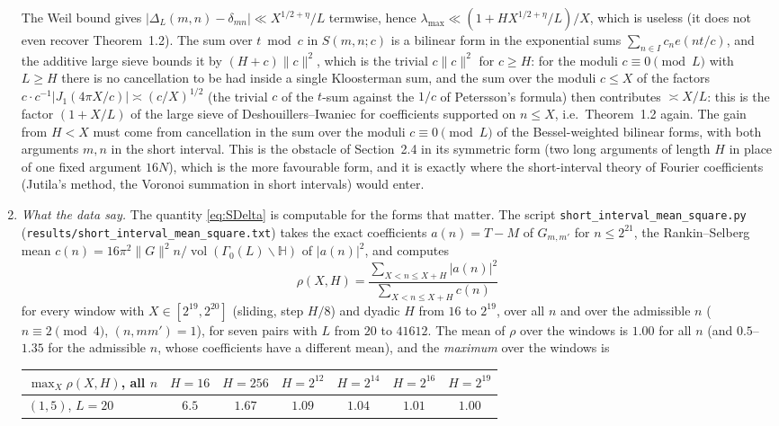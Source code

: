 \documentclass[11pt,a4paper]{article}
\theoremstyle{remark}
\theoremstyle{definition}
\newcommand{\HH}{\mathbb H}
\DeclareMathOperator{\vol}{vol}
\begin{document}
\begin{enumerate}[label=\textup{(\alph*)},leftmargin=2.2em]
The Weil bound gives $|\Delta_L(m,n)-\delta_{mn}|\ll X^{1/2+\eta}/L$ termwise, hence $\lambda_{\max}\ll(1+HX^{1/2+\eta}/L)/X$, which is useless (it does not even recover Theorem~1.2). The sum over $t\bmod c$ in $S(m,n;c)$ is a bilinear form in the exponential sums $\sum_{n\in I}c_ne(nt/c)$, and the additive large sieve bounds it by $(H+c)\|c\|^2$, which is the trivial $c\|c\|^2$ for $c\ge H$: for the moduli $c\equiv0\pmod L$ with $L\ge H$ there is no cancellation to be had inside a single Kloosterman sum, and the sum over the moduli $c\le X$ of the factors $c\cdot c^{-1}|J_1(4\pi X/c)|\asymp(c/X)^{1/2}$ (the trivial $c$ of the $t$-sum against the $1/c$ of Petersson's formula) then contributes $\asymp X/L$: this is the factor $(1+X/L)$ of the large sieve of Deshouillers--Iwaniec for coefficients supported on $n\le X$, i.e.\ Theorem~1.2 again. The gain from $H<X$ must come from cancellation in the sum over the moduli $c\equiv0\pmod L$ of the Bessel-weighted bilinear forms, with both arguments $m,n$ in the short interval. This is the obstacle of Section~2.4 in its symmetric form (two long arguments of length $H$ in place of one fixed argument $16N$), which is the more favourable form, and it is exactly where the short-interval theory of Fourier coefficients (Jutila's method, the Voronoi summation in short intervals) would enter.
\item \emph{What the data say.} The quantity \eqref{eq:SDelta} is computable for the forms that matter. The script \texttt{short\_interval\_mean\_square.py} (\texttt{results/short\_interval\_mean\_square.txt}) takes the exact coefficients $a(n)=T-M$ of $G_{m,m'}$ for $n\le2^{21}$, the Rankin--Selberg mean $c(n)=16\pi^2\|G\|^2n/\vol(\Gamma_0(L)\backslash\HH)$ of $|a(n)|^2$, and computes
\[
\rho(X,H)=\frac{\sum_{X<n\le X+H}|a(n)|^2}{\sum_{X<n\le X+H}c(n)}
\]
for every window with $X\in[2^{19},2^{20}]$ (sliding, step $H/8$) and dyadic $H$ from $16$ to $2^{19}$, over all $n$ and over the admissible $n$ ($n\equiv2\pmod4$, $(n,mm')=1$), for seven pairs with $L$ from $20$ to $41612$. The mean of $\rho$ over the windows is $1.00$ for all $n$ (and $0.5$--$1.35$ for the admissible $n$, whose coefficients have a different mean), and the \emph{maximum} over the windows is
\begin{center}\small
\begin{tabular}{l|cccccc}
\toprule
$\max_X\rho(X,H)$, all $n$ & $H=16$ & $H=256$ & $H=2^{12}$ & $H=2^{14}$ & $H=2^{16}$ & $H=2^{19}$\\
\midrule
$(1,5)$, $L=20$ & $6.5$ & $1.67$ & $1.09$ & $1.04$ & $1.01$ & $1.00$\\

\end{tabular}
\end{center}
\end{enumerate}
\end{document}
